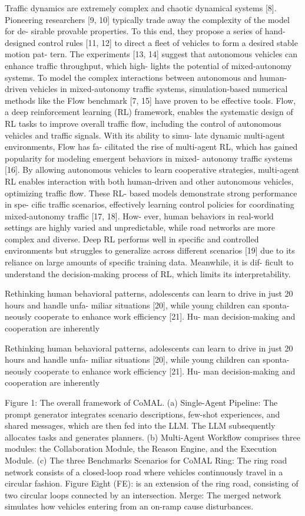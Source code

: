 \documentclass[12pt]{article}
\begin{document}
Traffic dynamics are extremely complex and chaotic
dynamical systems [8]. Pioneering researchers [9, 10]
typically trade away the complexity of the model for de-
sirable provable properties. To this end, they propose
a series of hand-designed control rules [11, 12] to direct
a fleet of vehicles to form a desired stable motion pat-
tern. The experiments [13, 14] suggest that autonomous
vehicles can enhance traffic throughput, which high-
lights the potential of mixed-autonomy systems. To
model the complex interactions between autonomous
and human-driven vehicles in mixed-autonomy traffic
systems, simulation-based numerical methods like the
Flow benchmark [7, 15] have proven to be effective tools.
Flow, a deep reinforcement learning (RL) framework,
enables the systematic design of RL tasks to improve
overall traffic flow, including the control of autonomous
vehicles and traffic signals. With its ability to simu-
late dynamic multi-agent environments, Flow has fa-
cilitated the rise of multi-agent RL, which has gained
popularity for modeling emergent behaviors in mixed-
autonomy traffic systems [16]. By allowing autonomous
vehicles to learn cooperative strategies, multi-agent RL
enables interaction with both human-driven and other
autonomous vehicles, optimizing traffic flow. These RL-
based models demonstrate strong performance in spe-
cific traffic scenarios, effectively learning control policies
for coordinating mixed-autonomy traffic [17, 18]. How-
ever, human behaviors in real-world settings are highly
varied and unpredictable, while road networks are more
complex and diverse. Deep RL performs well in specific
and controlled environments but struggles to generalize
across different scenarios [19] due to its reliance on large
amounts of specific training data. Meanwhile, it is dif-
ficult to understand the decision-making process of RL,
which limits its interpretability.


Rethinking human behavioral patterns, adolescents
can learn to drive in just 20 hours and handle unfa-
miliar situations [20], while young children can sponta-
neously cooperate to enhance work efficiency [21]. Hu-
man decision-making and cooperation are inherently


Rethinking human behavioral patterns, adolescents
can learn to drive in just 20 hours and handle unfa-
miliar situations [20], while young children can sponta-
neously cooperate to enhance work efficiency [21]. Hu-
man decision-making and cooperation are inherently


Figure 1: The overall framework of CoMAL. (a) Single-Agent Pipeline: The prompt generator integrates scenario
descriptions, few-shot experiences, and shared messages, which are then fed into the LLM. The LLM subsequently
allocates tasks and generates planners. (b) Multi-Agent Workflow comprises three modules: the Collaboration
Module, the Reason Engine, and the Execution Module. (c) The three Benchmarks Scenarios for CoMAL Ring:
The ring road network consists of a closed-loop road where vehicles continuously travel in a circular fashion.
Figure Eight (FE): is an extension of the ring road, consisting of two circular loops connected by an intersection.
Merge: The merged network simulates how vehicles entering from an on-ramp cause disturbances.
\end{document}
